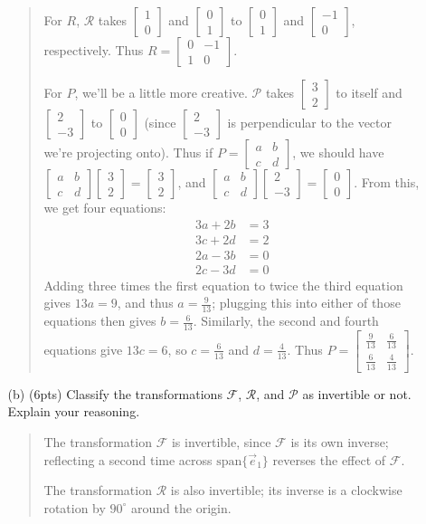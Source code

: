 \documentclass[11pt]{article}
\newcommand{\Span}{\mathrm{span}}
\newcommand{\mat}[1]{\begin{bmatrix}#1\end{bmatrix}}
\newenvironment{answer}{\begin{quote}\sffamily}{\end{quote}}
\begin{document}
\begin{enumerate}
\begin{enumerate}
\begin{answer}
			For $R$, $\mathcal{R}$ takes $\mat{1\\0}$ and $\mat{0\\1}$ to $\mat{0\\1}$ and $\mat{-1\\0}$, respectively.  Thus $R = \mat{0 & -1\\1 & 0}$.
			
			For $P$, we'll be a little more creative.  $\mathcal{P}$ takes $\mat{3\\2}$ to itself and $\mat{2\\-3}$ to $\mat{0\\0}$ (since $\mat{2\\-3}$ is perpendicular to the vector we're projecting onto).  Thus if $P = \mat{a & b \\ c & d}$, we should have $\mat{a & b \\ c & d} \mat{3\\2} = \mat{3\\2}$, and $\mat{a & b \\ c & d} \mat{2 \\ -3} = \mat{0 \\ 0}$.  From this, we get four equations:
			\begin{align*}
			3a + 2b &= 3 \\
			3c + 2d &= 2 \\
			2a - 3b &= 0 \\
			2c - 3d &= 0
			\end{align*}
			Adding three times the first equation to twice the third equation gives $13a = 9$, and thus $a = \frac{9}{13}$; plugging this into either of those equations then gives $b = \frac{6}{13}$.  Similarly, the second and fourth equations give $13c=6$, so $c = \frac{6}{13}$ and $d = \frac{4}{13}$.  Thus $P = \mat{\frac{9}{13} & \frac{6}{13} \\ \frac{6}{13} & \frac{4}{13}}$.
		\end{answer}
		
		\item[(b) (6pts)] Classify the transformations $\mathcal F$, $\mathcal R$,
		and $\mathcal P$ as invertible or not.  Explain your reasoning.
		\begin{answer}
			The transformation $\mathcal{F}$ is invertible, since $\mathcal{F}$ is its own inverse; reflecting a second time across $\Span \{ \vec{e}_1 \}$ reverses the effect of $\mathcal{F}$.
			
			The transformation $\mathcal{R}$ is also invertible; its inverse is a clockwise rotation by $90^\circ$ around the origin.
			

\end{answer}
\end{enumerate}
\end{enumerate}
\end{document}
